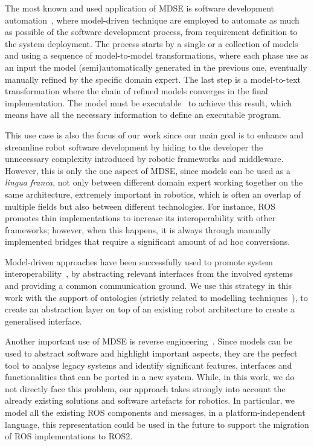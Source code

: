 The most known and used application of MDSE is software development automation~\cite{sendall2003model}, where model-driven technique are employed to automate as much as possible of the software development process, from requirement definition to the system deployment. The process starts by a single or a collection of models and using a sequence of model-to-model transformations, where each phase use as an input the model (semi)automatically generated in the previous one, eventually manually refined by the specific domain expert. The last step is a model-to-text transformation where the chain of refined models converges in the final implementation. The model must be executable~\cite{mellor2002executable} to achieve this result, which means have all the necessary information to define an executable program.

This use case is also the focus of our work since our main goal is to enhance and streamline robot software development by hiding to the developer the unnecessary complexity introduced by robotic frameworks and middleware. However, this is only the one aspect of MDSE, since models can be used as a \textit{lingua franca}, not only between different domain expert working together on the same architecture, extremely important in robotics, which is often an overlap of multiple fields but also between different technologies. For instance, ROS promotes thin implementations to increase its interoperability with other frameworks; however, when this happens, it is always through manually implemented bridges that require a significant amount of ad hoc conversions.

Model-driven approaches have been successfully used to promote system interoperability~\cite{chungoora2013model}, by abstracting relevant interfaces from the involved systems and providing a common communication ground. We use this strategy in this work with the support of ontologies (strictly related to modelling techniques~\cite{guizzardi2007ontology}), to create an abstraction layer on top of an existing robot architecture to create a generalised interface.

Another important use of MDSE is reverse engineering~\cite{bruneliere2010modisco, rugaber2004model}. Since models can be used to abstract software and highlight important aspects, they are the perfect tool to analyse legacy systems and identify significant features, interfaces and functionalities that can be ported in a new system. While, in this work, we do not directly face this problem, our approach takes strongly into account the already existing solutions and software artefacts for robotics. In particular, we model all the existing ROS components and messages, in a platform-independent language, this representation could be used in the future to support the migration of ROS implementations to ROS2.

